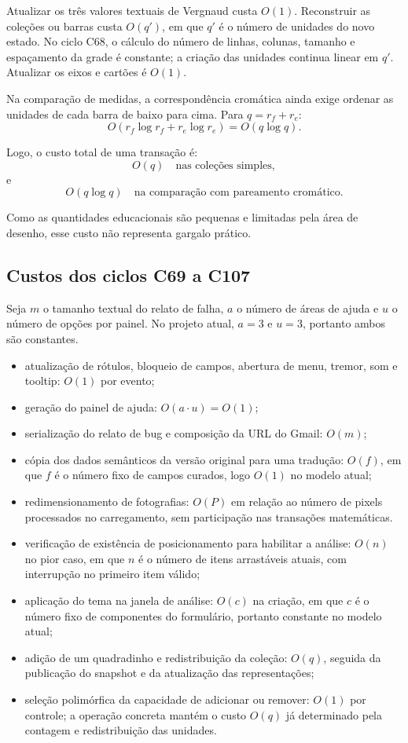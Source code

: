 \documentclass[12pt,a4paper]{article}
\begin{document}
Atualizar os três valores textuais de Vergnaud custa $O(1)$. Reconstruir as coleções ou barras custa $O(q')$, em que $q'$ é o número de unidades do novo estado. No ciclo C68, o cálculo do número de linhas, colunas, tamanho e espaçamento da grade é constante; a criação das unidades continua linear em $q'$. Atualizar os eixos e cartões é $O(1)$.

Na comparação de medidas, a correspondência cromática ainda exige ordenar as unidades de cada barra de baixo para cima. Para $q=r_f+r_e$:
\[
O(r_f\log r_f+r_e\log r_e)=O(q\log q).
\]

Logo, o custo total de uma transação é:
\[
O(q) \quad \text{nas coleções simples},
\]
e
\[
O(q\log q) \quad \text{na comparação com pareamento cromático}.
\]

Como as quantidades educacionais são pequenas e limitadas pela área de desenho, esse custo não representa gargalo prático.

\subsection{Custos dos ciclos C69 a C107}
Seja $m$ o tamanho textual do relato de falha, $a$ o número de áreas de ajuda e $u$ o número de opções por painel. No projeto atual, $a=3$ e $u=3$, portanto ambos são constantes.

\begin{itemize}[noitemsep]
  \item atualização de rótulos, bloqueio de campos, abertura de menu, tremor, som e tooltip: $O(1)$ por evento;
  \item geração do painel de ajuda: $O(a\cdot u)=O(1)$;
  \item serialização do relato de bug e composição da URL do Gmail: $O(m)$;
  \item cópia dos dados semânticos da versão original para uma tradução: $O(f)$, em que $f$ é o número fixo de campos curados, logo $O(1)$ no modelo atual;
  \item redimensionamento de fotografias: $O(P)$ em relação ao número de pixels processados no carregamento, sem participação nas transações matemáticas.
  \item verificação de existência de posicionamento para habilitar a análise: $O(n)$ no pior caso, em que $n$ é o número de itens arrastáveis atuais, com interrupção no primeiro item válido;
  \item aplicação do tema na janela de análise: $O(c)$ na criação, em que $c$ é o número fixo de componentes do formulário, portanto constante no modelo atual;
  \item adição de um quadradinho e redistribuição da coleção: $O(q)$, seguida da publicação do snapshot e da atualização das representações;
  \item seleção polimórfica da capacidade de adicionar ou remover: $O(1)$ por controle; a operação concreta mantém o custo $O(q)$ já determinado pela contagem e redistribuição das unidades.
\end{itemize}
\end{document}
